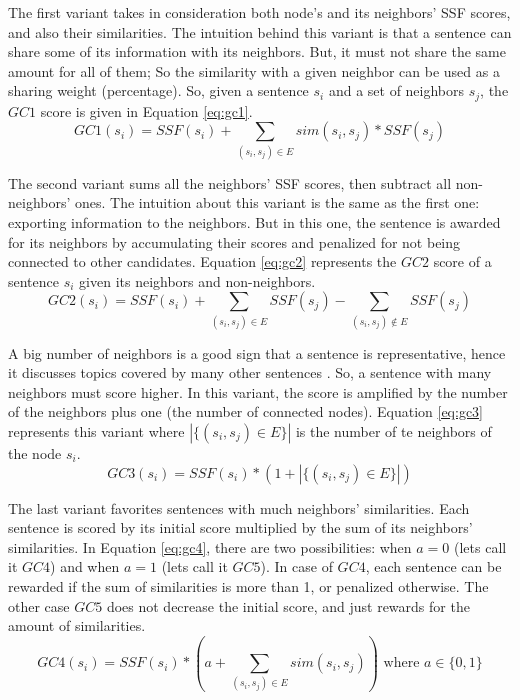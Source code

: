 \documentclass[12pt, oneside, a4paper]{article}
\begin{document}
The first variant takes in consideration both node's and its neighbors' SSF scores, and also their similarities.
The intuition behind this variant is that a sentence can share some of its information with its neighbors. 
But, it must not share the same amount for all of them; So the similarity with a given neighbor can be used as a sharing weight (percentage).
So, given a sentence $ s_i $ and a set of neighbors $ s_j $, the $ GC1 $ score is given in Equation \ref{eq:gc1}.
\begin{equation}
GC1(s_i) = SSF(s_i) + \sum\limits_{(s_i, s_j) \in E} sim(s_i, s_j) * SSF(s_j)
\label{eq:gc1}
\end{equation}

The second variant sums all the neighbors' SSF scores, then subtract all non-neighbors' ones.
The intuition about this variant is the same as the first one: exporting information to the neighbors. 
But in this one, the sentence is awarded for its neighbors by accumulating their scores and penalized for not being connected to other candidates.
Equation \ref{eq:gc2} represents the $ GC2 $ score of a sentence $ s_i $ given its neighbors and non-neighbors.
\begin{equation}
GC2(s_i) = SSF(s_i) + \sum\limits_{(s_i, s_j) \in E} SSF(s_j) - \sum\limits_{(s_i, s_j) \notin E} SSF(s_j)
\label{eq:gc2}
\end{equation}

A big number of neighbors is a good sign that a sentence is representative, hence it discusses topics covered by many other sentences \citep{97-salton-al}.
So, a sentence with many neighbors must score higher. 
In this variant, the score is amplified by the number of the neighbors plus one (the number of connected nodes). 
Equation \ref{eq:gc3} represents this variant where $ |\{(s_i, s_j) \in E\}| $ is the number of te neighbors of the node $ s_i $.
\begin{equation}
GC3(s_i) = SSF(s_i) * (1 + |\{(s_i, s_j) \in E\}|)
\label{eq:gc3}
\end{equation}

The last variant favorites sentences  with much neighbors' similarities. 
Each sentence is scored by its initial score multiplied by the sum of its neighbors' similarities. 
In Equation \ref{eq:gc4}, there are two possibilities: when $ a = 0 $ (lets call it $ GC4 $) and when $ a = 1 $ (lets call it $ GC5 $). 
In case of $ GC4 $, each sentence can be rewarded if the sum of similarities is more than 1, or penalized otherwise. 
The other case $ GC5 $ does not decrease the initial score, and just rewards for the amount of similarities.
\begin{equation}
GC4(s_i) = SSF(s_i) * ( a + \sum\limits_{(s_i, s_j) \in E} sim(s_i, s_j)) \text{ where } a \in \{0, 1\}
\label{eq:gc4}
\end{equation}
\end{document}
